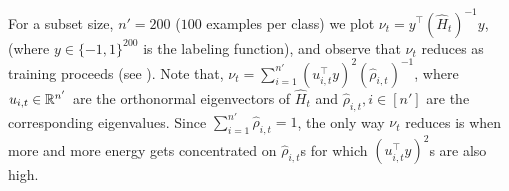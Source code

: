 For a subset size, $n'=200$ ($100$ examples per class) we plot $\nu_t=y^\top (\widehat{H}_t)^{-1} y$, (where $y\in\{-1,1\}^{200}$ is the labeling function), and observe that $\nu_t$ reduces as training proceeds (see ). Note that, $\nu_t=\sum_{i=1}^{n'}(u_{i,t}^\top y)^2 (\hat{\rho}_{i,t})^{-1}$, where $u_{i,t}\in \mathbb{R}^{n'}$ are the orthonormal eigenvectors of $\widehat{H}_t$ and $\hat{\rho}_{i,t},i\in[n']$ are the corresponding eigenvalues. Since $\sum_{i=1}^{n'}\hat{\rho}_{i,t}=1$, the only way $\nu_t$ reduces is when more and more energy gets concentrated on $\hat{\rho}_{i,t}$s for which $(u_{i,t}^\top y)^2$s are also high.\WFclear%


